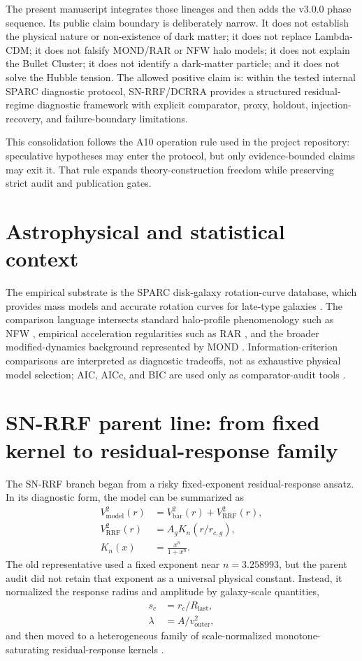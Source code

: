 \documentclass[11pt]{article}
\begin{document}
The present manuscript integrates those lineages and then adds the v3.0.0 phase sequence. Its public claim boundary is deliberately narrow. It does not establish the physical nature or non-existence of dark matter; it does not replace Lambda-CDM; it does not falsify MOND/RAR or NFW halo models; it does not explain the Bullet Cluster; it does not identify a dark-matter particle; and it does not solve the Hubble tension. The allowed positive claim is: within the tested internal SPARC diagnostic protocol, SN-RRF/DCRRA provides a structured residual-regime diagnostic framework with explicit comparator, proxy, holdout, injection-recovery, and failure-boundary limitations.

This consolidation follows the A10 operation rule used in the project repository: speculative hypotheses may enter the protocol, but only evidence-bounded claims may exit it. That rule expands theory-construction freedom while preserving strict audit and publication gates.

\section{Astrophysical and statistical context}
The empirical substrate is the SPARC disk-galaxy rotation-curve database, which provides mass models and accurate rotation curves for late-type galaxies \cite{lelli_sparc}. The comparison language intersects standard halo-profile phenomenology such as NFW \cite{nfw}, empirical acceleration regularities such as RAR \cite{rar}, and the broader modified-dynamics background represented by MOND \cite{mond}. Information-criterion comparisons are interpreted as diagnostic tradeoffs, not as exhaustive physical model selection; AIC, AICc, and BIC are used only as comparator-audit tools \cite{akaike,hurvich_tsai,schwarz}.

\section{SN-RRF parent line: from fixed kernel to residual-response family}
The SN-RRF branch began from a risky fixed-exponent residual-response ansatz. In its diagnostic form, the model can be summarized as
\begin{align}
V^2_{\mathrm{model}}(r) &= V^2_{\mathrm{bar}}(r) + V^2_{\mathrm{RRF}}(r),\\
V^2_{\mathrm{RRF}}(r) &= A_g K_n(r/r_{c,g}),\\
K_n(x) &= \frac{x^n}{1+x^n}.
\end{align}
The old representative used a fixed exponent near $n=3.258993$, but the parent audit did not retain that exponent as a universal physical constant. Instead, it normalized the response radius and amplitude by galaxy-scale quantities,
\begin{align}
s_c &= r_c/R_{\mathrm{last}},\\
\lambda &= A/v^2_{\mathrm{outer}},
\end{align}
and then moved to a heterogeneous family of scale-normalized monotone-saturating residual-response kernels \cite{yoshimura_snrrf}.
\end{document}
